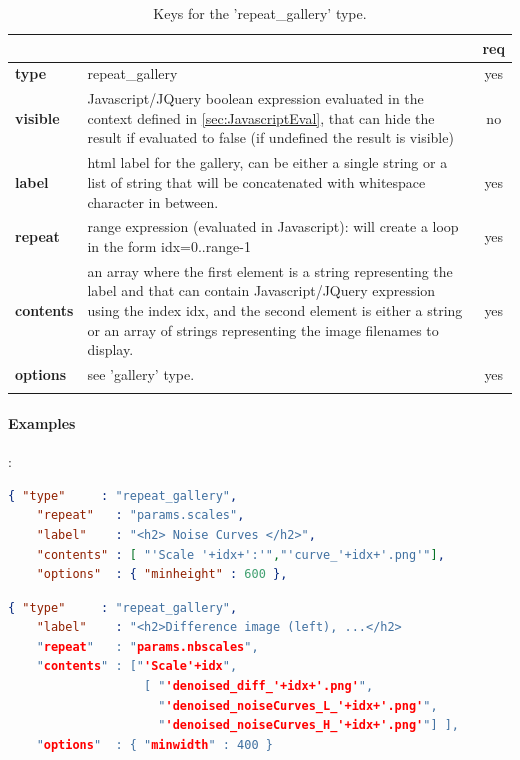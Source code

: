 \begin{longtable}{|>{\bf}L{\linewidth}|L{\linewidth}|c|}
\hline
{}     &  & {\bf req} \tabularnewline 
\hline \hline
 type       & repeat\_gallery  & yes \\ \hline
 visible    & Javascript/JQuery boolean expression evaluated in the context 
              defined in \ref{sec:JavascriptEval}, that can hide the result if
              evaluated to false (if undefined the result is visible)& no \\ \hline
 label      & html label for the gallery, can be either a single string or 
             a list of string that will be concatenated with whitespace character
              in between.& yes \\ \hline
 repeat     & range expression (evaluated in Javascript):
              will create a loop in the form idx=0..range-1 & yes \\ \hline
 contents   & an array where the first element is a string representing the label
              and that can contain Javascript/JQuery expression using the index idx, and
              the second element is either a string or an array of strings
              representing the image filenames to display. & yes \\ \hline
 options    & see 'gallery' type. & yes \\ \hline
\caption{Keys for the 'repeat\_gallery' type.}
\end{longtable}

\paragraph{Examples}:\\
\begin{lstlisting}[language=json,firstnumber=1]
  { "type"     : "repeat_gallery",
    "repeat"   : "params.scales",
    "label"    : "<h2> Noise Curves </h2>",
    "contents" : [ "'Scale '+idx+':'","'curve_'+idx+'.png'"],
    "options"  : { "minheight" : 600 },
\end{lstlisting}

\begin{lstlisting}[language=json,firstnumber=1]
  { "type"     : "repeat_gallery",
    "label"    : "<h2>Difference image (left), ...</h2> 
    "repeat"   : "params.nbscales",
    "contents" : ["'Scale'+idx",
                   [ "'denoised_diff_'+idx+'.png'",
                     "'denoised_noiseCurves_L_'+idx+'.png'",
                     "'denoised_noiseCurves_H_'+idx+'.png'"] ],
    "options"  : { "minwidth" : 400 }
\end{lstlisting}


